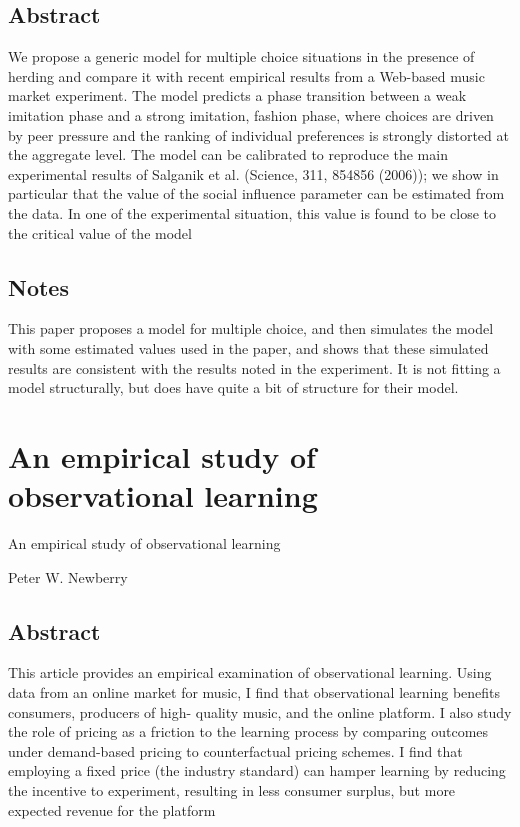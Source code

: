 \documentclass[12pt]{article}
\begin{document}
\subsection{Abstract}
We propose a generic model for multiple choice situations in the
presence of herding and compare it with recent empirical results from
a Web-based music market experiment. The model predicts a phase
transition between a weak imitation phase and a strong imitation,
fashion phase, where choices are driven by peer pressure and
the ranking of individual preferences is strongly distorted at the
aggregate level. The model can be calibrated to reproduce the main
experimental results of Salganik et al. (Science, 311, 854856
(2006)); we show in particular that the value of the social influence
parameter can be estimated from the data. In one of the experimental
situation, this value is found to be close to the critical value of
the model

\subsection{Notes}

This paper proposes a model for multiple choice, and then simulates
the model with some estimated values used in the paper, and shows that
these simulated results are consistent with the results noted in the
experiment. It is not fitting a model structurally, but does have
quite a bit of structure for their model.


\section{An empirical study of observational learning}
An empirical study of observational learning\par
Peter W. Newberry\par

\subsection{Abstract}
This article provides an empirical examination of observational
learning. Using data from an online market for music, I find that
observational learning benefits consumers, producers of high- quality
music, and the online platform. I also study the role of pricing as a
friction to the learning process by comparing outcomes under
demand-based pricing to counterfactual pricing schemes.  I find that
employing a fixed price (the industry standard) can hamper learning by
reducing the incentive to experiment, resulting in less consumer
surplus, but more expected revenue for the platform
\end{document}
